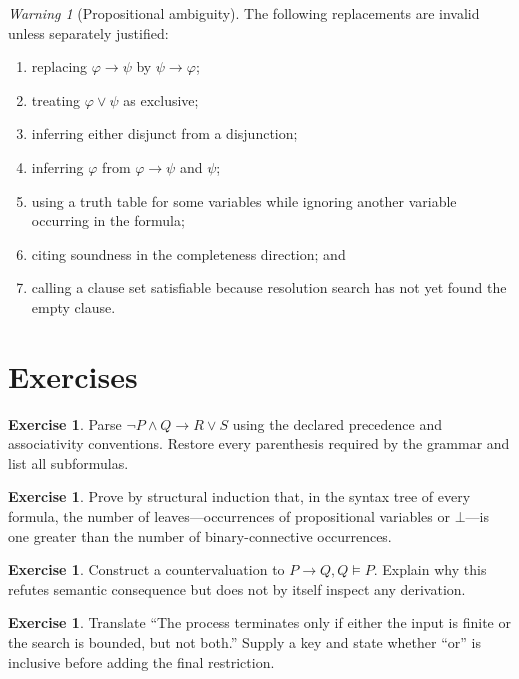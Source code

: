 \documentclass[11pt,oneside,openany]{book}
\theoremstyle{definition}
\newtheorem{exercise}[definition]{Exercise}
\theoremstyle{plain}
\theoremstyle{remark}
\newtheorem{warning}[definition]{Warning}
\newcommand{\entails}{\models}
\newcommand{\bottom}{\bot}
\begin{document}
\begin{warning}[Propositional ambiguity]
The following replacements are invalid unless separately justified:
\begin{enumerate}
  \item replacing \(\varphi\to\psi\) by \(\psi\to\varphi\);
  \item treating \(\varphi\lor\psi\) as exclusive;
  \item inferring either disjunct from a disjunction;
  \item inferring \(\varphi\) from \(\varphi\to\psi\) and \(\psi\);
  \item using a truth table for some variables while ignoring another variable
        occurring in the formula;
  \item citing soundness in the completeness direction; and
  \item calling a clause set satisfiable because resolution search has not yet
        found the empty clause.
\end{enumerate}
\end{warning}

\section{Exercises}
\label{sec:prop-metatheory-06}

\begin{exercise}
\label{ex:prop-metatheory-01}
Parse
\(\neg P\land Q\to R\lor S\) using the declared precedence and associativity
conventions.  Restore every parenthesis required by the grammar and list all
subformulas.
\end{exercise}

\begin{exercise}
\label{ex:prop-metatheory-02}
Prove by structural induction that, in the syntax tree of every formula, the
number of leaves---occurrences of propositional variables or \(\bottom\)---is
one greater than the number of binary-connective occurrences.
\end{exercise}

\begin{exercise}
\label{ex:prop-metatheory-03}
Construct a countervaluation to
\(P\to Q,Q\entails P\).  Explain why this refutes semantic consequence but
does not by itself inspect any derivation.
\end{exercise}

\begin{exercise}
\label{ex:prop-metatheory-04}
Translate ``The process terminates only if either the input is finite or the
search is bounded, but not both.''  Supply a key and state whether ``or'' is
inclusive before adding the final restriction.
\end{exercise}
\end{document}
